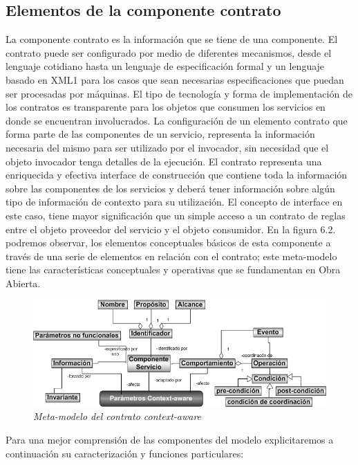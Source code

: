 \documentclass{llncs}
\begin{document}
\subsection {Elementos de la componente contrato}

La componente contrato es la información que se tiene de una componente. El contrato puede ser configurado por medio de diferentes mecanismos, desde el lenguaje cotidiano hasta un lenguaje de especificación formal y un lenguaje basado en XML1 para los casos que sean necesarias especificaciones que puedan ser procesadas por máquinas. 
El tipo de tecnología y forma de implementación de los contratos es transparente para los objetos que consumen los servicios en donde se encuentran involucrados.
La configuración de un elemento contrato que forma parte de  las componentes de un servicio, representa la información necesaria del mismo para ser utilizado por el invocador, sin necesidad que el objeto invocador tenga detalles de la ejecución.
El contrato representa una enriquecida y efectiva interface de construcción que contiene toda la información sobre las componentes de los servicios y deberá tener información sobre algún tipo de información de contexto para su utilización.
El concepto de interface en este caso, tiene mayor significación que un simple acceso a un contrato de reglas entre el objeto proveedor del servicio y el objeto consumidor.
En la figura 6.2. podremos observar, los elementos conceptuales básicos de esta componente a través de una serie de elementos en relación con el contrato; este meta-modelo tiene las características conceptuales y operativas que se fundamentan en Obra Abierta. 

\begin{figure}[!h]
        	\begin{center}
		\includegraphics[width= 4 in,totalheight=2 in]{contratos_ca.jpg}
                \caption{\small \sl Meta-modelo del contrato context-aware} \label{requerimientos}
         	\end{center}
         \end{figure}


Para una mejor comprensión de las componentes del modelo explicitaremos a continuación su caracterización y funciones particulares: 
\end{document}
